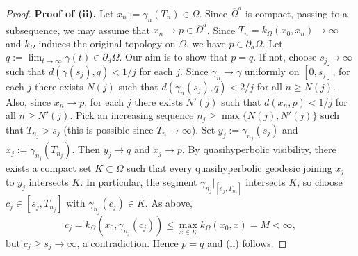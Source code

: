 \documentclass[a4paper,12pt]{amsart}
\theoremstyle{definition}
\begin{document}
\begin{proof}
	\noindent\textbf{Proof of (ii).}
	Let $x_n:=\gamma_n(T_n)\in\Omega$. Since $\overline{\Omega}^d$ is compact, passing to a subsequence, we may assume that $x_n\to p\in\overline{\Omega}^d$.
	Since $T_n=k_\Omega(x_0,x_n)\to\infty$ and $k_\Omega$ induces the original topology on $\Omega$, we have $p\in\partial_d\Omega$.
	Let $q:=\lim_{t\to\infty}\gamma(t)\in\partial_d\Omega$. Our aim is to show that $p=q$. If not, choose $s_j\to\infty$ such that $d(\gamma(s_j),q)<1/j$ for each $j$.
		Since $\gamma_n\to\gamma$ uniformly on $[0,s_j]$, for each $j$ there exists $N(j)$ such that
		$d(\gamma_n(s_j),q)<2/j$ for all $n\ge N(j)$.
		Also, since $x_n\to p$, for each $j$ there exists $N'(j)$ such that $d(x_n,p)<1/j$ for all $n\ge N'(j)$. Pick an increasing sequence $n_j\ge \max\{N(j),N'(j)\}$ such that $T_{n_j}>s_j$ (this is possible since $T_n\to \infty$). Set $y_j:=\gamma_{n_j}(s_j)$ and $x_j:=\gamma_{n_j}(T_{n_j})$. Then $y_j\to q$ and $x_j\to p$. By quasihyperbolic visibility, there exists a compact set $K\subset\Omega$ such that every quasihyperbolic geodesic joining $x_j$ to $y_j$ intersects $K$.
	In particular, the segment $\gamma_{n_j}|_{[s_j,T_{n_j}]}$ intersects $K$, so choose
	$c_j\in[s_j,T_{n_j}]$ with $\gamma_{n_j}(c_j)\in K$. As above,
	\[
	c_j=k_\Omega(x_0,\gamma_{n_j}(c_j))\le \max_{x\in K}k_\Omega(x_0,x)=M<\infty,
	\]
	but $c_j\ge s_j\to\infty$, a contradiction. Hence $p=q$ and (ii) follows.
\end{proof}
\end{document}
